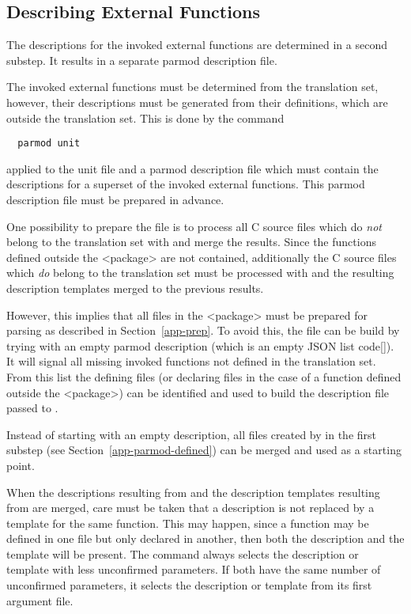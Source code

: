 \subsection{Describing External Functions}
\label{app-parmod-extern}

The descriptions for the invoked external functions are determined in a second substep. It results in 
a separate parmod description file. 

The invoked external functions must be determined from the translation set, however, their descriptions must
be generated from their definitions, which are outside the translation set. This is done by the command
\begin{verbatim}
  parmod unit
\end{verbatim}
applied to the unit file and a parmod description file which must contain the descriptions for a superset
of the invoked external functions. This parmod description file must be prepared in advance.

One possibility to prepare the file is to process all C source files which do \textit{not} belong to the 
translation set with  and merge the results. Since the functions defined outside the <package>
are not contained, additionally the C source files which \textit{do} belong to the translation set must be
processed with  and the resulting description templates merged to the previous results. 

However, this implies that all files in the
<package> must be prepared for parsing as described in Section~\ref{app-prep}. To avoid this, the file can
be build by trying  with an empty parmod description (which is an empty JSON list code{[]}).
It will signal all missing invoked functions not defined in the translation set. From this list the defining 
files (or declaring files in the case of a function defined outside the <package>) can be identified and used 
to build the description file passed to .

Instead of starting with an empty description, all files created by  in the first substep 
(see Section~\ref{app-parmod-defined}) can be merged and used as a starting point.  

When the descriptions resulting from  and the description templates resulting from 
are merged, care must be taken that a description is not replaced by a template for the same function. This may 
happen, since a function may be defined in one  file but only declared in another, then both the description
and the template will be present. The command  always selects the description or template with less 
unconfirmed parameters. If both have the same number of unconfirmed parameters, it selects the description or template from
its first argument file. 

